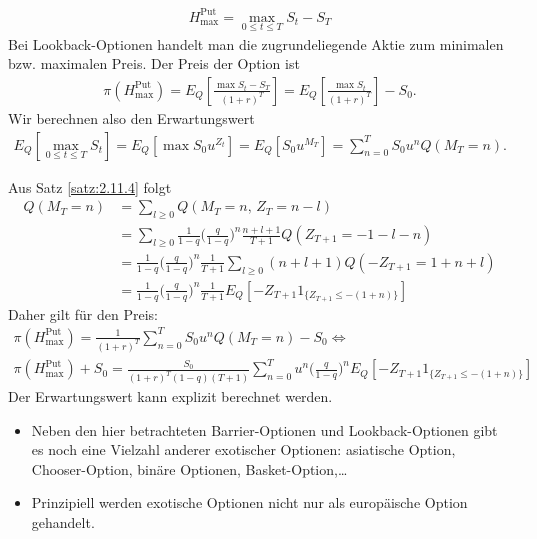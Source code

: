 \documentclass[a4paper,twoside,DIV15,BCOR12mm]{scrbook}
\begin{document}
\begin{beispiel}
\begin{align*}
H_{\text{max}}^{\text{Put}} =  \max_{0\le t\le T} S_t - S_T
\end{align*}
Bei Lookback-Optionen handelt man die zugrundeliegende Aktie zum minimalen bzw. maximalen Preis.
Der Preis der Option ist
\begin{align*}
\pi(H_{\text{max}}^{\text{Put}})=E_Q\left[\frac{\max S_t-S_T}{(1+r)^T}\right]=E_Q\left[\frac{\max S_t}{(1+r)^T}\right]-S_0.
\end{align*}
Wir berechnen also den Erwartungswert
\begin{align*}
E_Q [\max_{0\le t\le T} S_t] 
= E_Q [\max S_0 u^{Z_t}] 
= E_Q[S_0 u^{M_T}] 
= \sum_{n=0}^T S_0 u^n Q(M_T = n).
\end{align*}

Aus Satz \ref{satz:2.11.4} folgt
\begin{align*}
Q(M_T = n) &= \sum_{l\ge 0} Q(M_T=n,\, Z_T = n-l) \\
&= \sum_{l\ge 0} \frac{1}{1-q} \bigg(\frac{q}{1-q}\bigg)^n \frac{n+l+1}{T+1} Q(Z_{T+1} = -1 - l -n) \\
&= \frac{1}{1-q} \bigg(\frac{q}{1-q}\bigg)^n  \frac{1}{T+1} \sum_{l\ge0} (n+l+1) Q(-Z_{T+1} = 1 + n + l) \\
&= \frac{1}{1-q} \bigg(\frac{q}{1-q}\bigg)^n  \frac{1}{T+1} E_Q[-Z_{T+1} 1_{\{Z_{T+1} \le -(1+n)\}}]
\end{align*}
Daher gilt für den Preis:
\begin{multline*}
\pi(H_{\text{max}}^{\text{Put}}) = \frac1{(1+r)^T} \sum_{n=0}^T S_0 u^n Q(M_T = n) - S_0
\iff \\
\pi(H_{\text{max}}^{\text{Put}}) + S_0 =
\frac{S_0}{(1+r)^T(1-q)(T+1)} \sum_{n=0}^T u^n \bigg(\frac{q}{1-q}\bigg)^n E_Q[-Z_{T+1} 1_{\{Z_{T+1} \le -(1+n)\}}]
\end{multline*}
Der Erwartungswert kann explizit berechnet werden.
\end{beispiel}

\begin{bemerkung}
\begin{itemize}
\item Neben den hier betrachteten Barrier-Optionen und Lookback-Optionen gibt es noch eine Vielzahl anderer exotischer Optionen: asiatische Option, Chooser-Option, binäre Optionen, Basket-Option,\ldots
\item Prinzipiell werden exotische Optionen nicht nur als europäische Option gehandelt.
\end{itemize}
\end{bemerkung}
\end{document}
